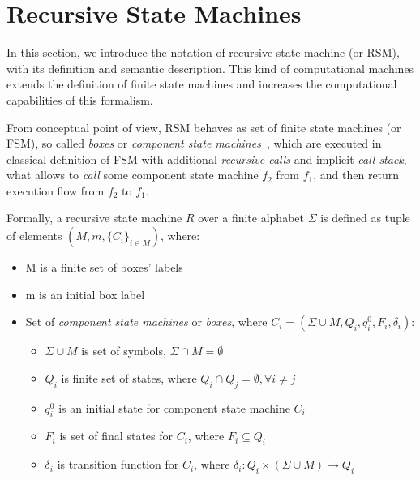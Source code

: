 \section{Recursive State Machines}



In this section, we introduce the notation of recursive state machine (or RSM), with its definition and semantic description. This kind of computational machines extends the definition of finite state machines and increases the computational capabilities of this formalism.

From conceptual point of view, RSM behaves as set of finite state machines (or FSM), so called \textit{boxes} or \textit{component state machines}~\cite{rsm:analysis:10.1007/3-540-44585-4_18}, which are executed in classical definition of  FSM with additional \textit{recursive calls} and implicit \textit{call stack}, what allows to \textit{call} some component state machine $f_2$ from $f_1$, and then return execution flow from $f_2$ to $f_1$.

Formally, a recursive state machine $R$ over a finite alphabet $\Sigma$ is defined as tuple of elements $(M,m,\{C_i\}_{i \in M})$, where:

\begin{itemize}
    \item M is a finite set of boxes' labels
    \item m is an initial box label
    \item Set of \textit{component state machines} or \textit{boxes}, 
          where $C_i=(\Sigma \cup M, Q_i,q_i^0,F_i,\delta_i)$:
    \begin{itemize}
        \item $\Sigma \cup M$ is set of symbols, $\Sigma \cap M = \emptyset$
        \item $Q_i$ is finite set of states, 
              where $Q_i \cap Q_j = \emptyset, \forall i \neq j$
        \item $q_i^0$ is an initial state for component state machine $C_i$
        \item $F_i$ is set of final states for $C_i$, where $F_i \subseteq Q_i$
        \item $\delta_i$ is transition function for $C_i$, 
              where $\delta_i: Q_i \times (\Sigma \cup M) 
              \to Q_i$
    \end{itemize}
\end{itemize}

